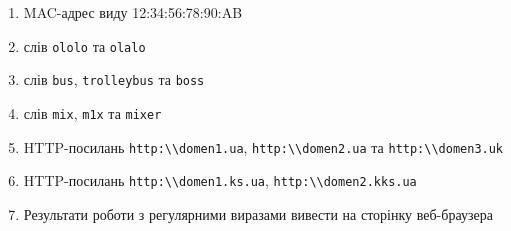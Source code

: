 \begin{enumerate}
\item MAC-адрес виду 12:34:56:78:90:AB
\item слів \verb'ololo' та \verb'olalo'
\item слів \verb'bus', \verb'trolleybus' та \verb'boss'
\item слів \verb'mix', \verb'm1x' та \verb'mixer'
\item HTTP-посилань \verb'http:\\domen1.ua', \verb'http:\\domen2.ua' та \verb'http:\\domen3.uk'
\item HTTP-посилань \verb'http:\\domen1.ks.ua', \verb'http:\\domen2.kks.ua'
\item[]Результати роботи з регулярними виразами вивести на сторінку веб-браузера 

\end{enumerate}


